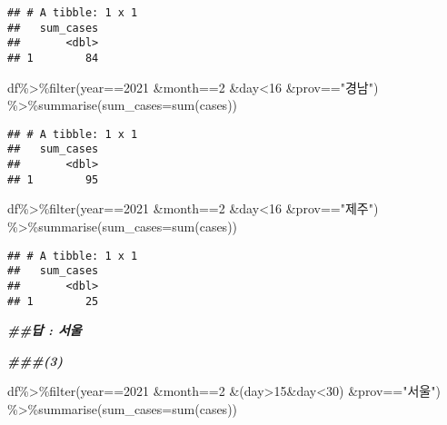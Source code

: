 \documentclass[
]{article}
\newenvironment{Shaded}{\begin{snugshade}}{\end{snugshade}}
\newcommand{\AttributeTok}[1]{\textcolor[rgb]{0.77,0.63,0.00}{#1}}
\newcommand{\DecValTok}[1]{\textcolor[rgb]{0.00,0.00,0.81}{#1}}
\newcommand{\DocumentationTok}[1]{\textcolor[rgb]{0.56,0.35,0.01}{\textbf{\textit{#1}}}}
\newcommand{\FunctionTok}[1]{\textcolor[rgb]{0.00,0.00,0.00}{#1}}
\newcommand{\NormalTok}[1]{#1}
\newcommand{\SpecialCharTok}[1]{\textcolor[rgb]{0.00,0.00,0.00}{#1}}
\newcommand{\StringTok}[1]{\textcolor[rgb]{0.31,0.60,0.02}{#1}}
\begin{document}
\begin{verbatim}
## # A tibble: 1 x 1
##   sum_cases
##       <dbl>
## 1        84
\end{verbatim}

\begin{Shaded}
\begin{Highlighting}[]
\NormalTok{df}\SpecialCharTok{\%\textgreater{}\%}\FunctionTok{filter}\NormalTok{(year}\SpecialCharTok{==}\DecValTok{2021} \SpecialCharTok{\&}\NormalTok{month}\SpecialCharTok{==}\DecValTok{2} \SpecialCharTok{\&}\NormalTok{day}\SpecialCharTok{\textless{}}\DecValTok{16} \SpecialCharTok{\&}\NormalTok{prov}\SpecialCharTok{==}\StringTok{"경남"}\NormalTok{) }\SpecialCharTok{\%\textgreater{}\%}\FunctionTok{summarise}\NormalTok{(}\AttributeTok{sum\_cases=}\FunctionTok{sum}\NormalTok{(cases))}
\end{Highlighting}
\end{Shaded}

\begin{verbatim}
## # A tibble: 1 x 1
##   sum_cases
##       <dbl>
## 1        95
\end{verbatim}

\begin{Shaded}
\begin{Highlighting}[]
\NormalTok{df}\SpecialCharTok{\%\textgreater{}\%}\FunctionTok{filter}\NormalTok{(year}\SpecialCharTok{==}\DecValTok{2021} \SpecialCharTok{\&}\NormalTok{month}\SpecialCharTok{==}\DecValTok{2} \SpecialCharTok{\&}\NormalTok{day}\SpecialCharTok{\textless{}}\DecValTok{16} \SpecialCharTok{\&}\NormalTok{prov}\SpecialCharTok{==}\StringTok{"제주"}\NormalTok{) }\SpecialCharTok{\%\textgreater{}\%}\FunctionTok{summarise}\NormalTok{(}\AttributeTok{sum\_cases=}\FunctionTok{sum}\NormalTok{(cases))}
\end{Highlighting}
\end{Shaded}

\begin{verbatim}
## # A tibble: 1 x 1
##   sum_cases
##       <dbl>
## 1        25
\end{verbatim}

\begin{Shaded}
\begin{Highlighting}[]
\DocumentationTok{\#\#답 : 서울}

\DocumentationTok{\#\#\#(3)}

\NormalTok{df}\SpecialCharTok{\%\textgreater{}\%}\FunctionTok{filter}\NormalTok{(year}\SpecialCharTok{==}\DecValTok{2021} \SpecialCharTok{\&}\NormalTok{month}\SpecialCharTok{==}\DecValTok{2} \SpecialCharTok{\&}\NormalTok{(day}\SpecialCharTok{\textgreater{}}\DecValTok{15}\SpecialCharTok{\&}\NormalTok{day}\SpecialCharTok{\textless{}}\DecValTok{30}\NormalTok{) }\SpecialCharTok{\&}\NormalTok{prov}\SpecialCharTok{==}\StringTok{"서울"}\NormalTok{) }\SpecialCharTok{\%\textgreater{}\%}\FunctionTok{summarise}\NormalTok{(}\AttributeTok{sum\_cases=}\FunctionTok{sum}\NormalTok{(cases))}
\end{Highlighting}
\end{Shaded}
\end{document}
